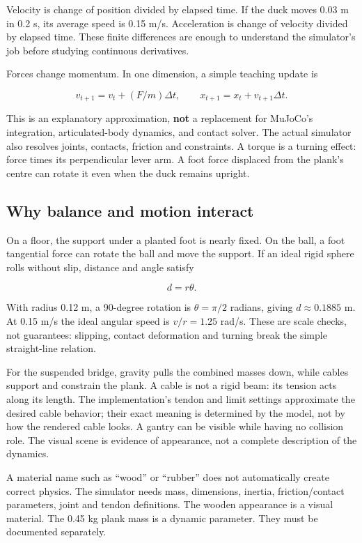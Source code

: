 \documentclass[
  american,
  11pt,
  letterpaper,
]{article}
\begin{document}
Velocity is change of position divided by elapsed time. If the duck
moves 0.03 m in 0.2 s, its average speed is 0.15 m/s. Acceleration is
change of velocity divided by elapsed time. These finite differences are
enough to understand the simulator's job before studying continuous
derivatives.

Forces change momentum. In one dimension, a simple teaching update is

\[v_{t+1}=v_t+(F/m)\Delta t,\qquad x_{t+1}=x_t+v_{t+1}\Delta t.\]

This is an explanatory approximation, \textbf{not} a replacement for
MuJoCo's integration, articulated-body dynamics, and contact solver. The
actual simulator also resolves joints, contacts, friction and
constraints. A torque is a turning effect: force times its perpendicular
lever arm. A foot force displaced from the plank's centre can rotate it
even when the duck remains upright.

\subsection{Why balance and motion
interact}\label{why-balance-and-motion-interact}

On a floor, the support under a planted foot is nearly fixed. On the
ball, a foot tangential force can rotate the ball and move the support.
If an ideal rigid sphere rolls without slip, distance and angle satisfy

\[d=r\theta.\]

With radius 0.12 m, a 90-degree rotation is \(\theta=\pi/2\) radians,
giving \(d\approx0.1885\) m. At 0.15 m/s the ideal angular speed is
\(v/r=1.25\) rad/s. These are scale checks, not guarantees: slipping,
contact deformation and turning break the simple straight-line relation.

For the suspended bridge, gravity pulls the combined masses down, while
cables support and constrain the plank. A cable is not a rigid beam: its
tension acts along its length. The implementation's tendon and limit
settings approximate the desired cable behavior; their exact meaning is
determined by the model, not by how the rendered cable looks. A gantry
can be visible while having no collision role. The visual scene is
evidence of appearance, not a complete description of the dynamics.

A material name such as ``wood'' or ``rubber'' does not automatically
create correct physics. The simulator needs mass, dimensions, inertia,
friction/contact parameters, joint and tendon definitions. The wooden
appearance is a visual material. The 0.45 kg plank mass is a dynamic
parameter. They must be documented separately.
\end{document}
